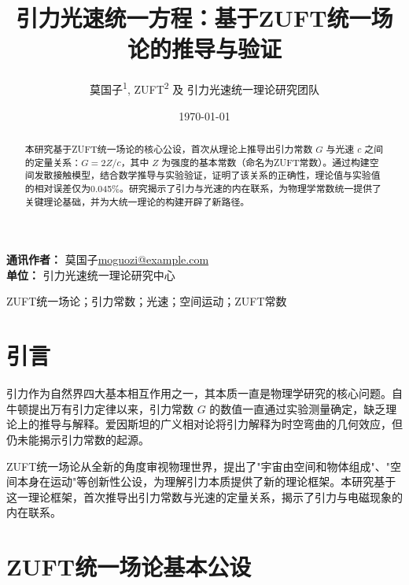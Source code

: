 \documentclass[12pt,a4paper]{article}
\title{
\textbf{引力光速统一方程：基于ZUFT统一场论的推导与验证}
}
\author{
莫国子\textsuperscript{1}, ZUFT\textsuperscript{2} 及 引力光速统一理论研究团队
}
\date{\today}
\begin{document}
\begin{titlepage}
\maketitle
\vspace{2cm}
\begin{minipage}{0.9\textwidth}
\noindent\textbf{通讯作者：} 莫国子\quad\href{mailto:moguozi@example.com}{moguozi@example.com}\\
\noindent\textbf{单位：} 引力光速统一理论研究中心
\end{minipage}
\end{titlepage}

\newpage
\setcounter{page}{1}

\begin{abstract}
本研究基于ZUFT统一场论的核心公设，首次从理论上推导出引力常数 $G$ 与光速 $c$ 之间的定量关系：$G = 2Z/c$，其中 $Z$ 为强度的基本常数（命名为ZUFT常数）。通过构建空间发散接触模型，结合数学推导与实验验证，证明了该关系的正确性，理论值与实验值的相对误差仅为0.045\%。研究揭示了引力与光速的内在联系，为物理学常数统一提供了关键理论基础，并为大统一理论的构建开辟了新路径。
\end{abstract}

\begin{keywords}
ZUFT统一场论；引力常数；光速；空间运动；ZUFT常数
\end{keywords}

\newpage
\tableofcontents
\newpage

\section{引言}
\label{section:introduction}

引力作为自然界四大基本相互作用之一，其本质一直是物理学研究的核心问题。自牛顿提出万有引力定律以来，引力常数 $G$ 的数值一直通过实验测量确定，缺乏理论上的推导与解释。爱因斯坦的广义相对论将引力解释为时空弯曲的几何效应，但仍未能揭示引力常数的起源。

ZUFT统一场论从全新的角度审视物理世界，提出了"宇宙由空间和物体组成"、"空间本身在运动"等创新性公设，为理解引力本质提供了新的理论框架。本研究基于这一理论框架，首次推导出引力常数与光速的定量关系，揭示了引力与电磁现象的内在联系。

\section{ZUFT统一场论基本公设}
\label{section:fundamental_postulates}
\end{document}
